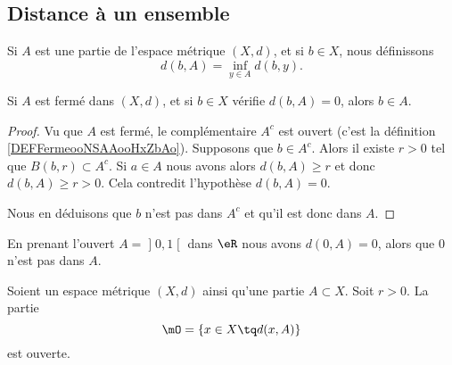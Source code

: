 \subsection{Distance à un ensemble}

\begin{definition}      \label{DEFooGNNUooFUZINs}
    Si \( A\) est une partie de l'espace métrique \( (X,d)\), et si \( b\in X\), nous définissons
    \begin{equation}
        d(b,A)=\inf_{y\in A}d(b,y).
    \end{equation}
\end{definition}

\begin{lemma}        \label{LEMooAIARooQADaxM}
    Si \( A\) est fermé dans \( (X,d)\), et si \( b\in X\) vérifie \( d(b,A)=0\), alors \( b\in A\).
\end{lemma}

\begin{proof}
    Vu que \( A\) est fermé, le complémentaire \( A^c\) est ouvert (c'est la définition \ref{DEFFermeooNSAAooHxZbAo}). Supposons que \( b\in A^c\). Alors il existe \( r>0\) tel que \( B(b,r)\subset A^c\). Si \( a\in A\) nous avons alors \( d(b,A)\geq r\) et donc \( d(b,A)\geq r>0\). Cela contredit l'hypothèse \( d(b,A)=0\).

    Nous en déduisons que \( b\) n'est pas dans \( A^c\) et qu'il est donc dans \( A\).
\end{proof}


\begin{example}
    En prenant l'ouvert \( A=\mathopen] 0 , 1 \mathclose[\) dans \( \eR\) nous avons \( d(0,A)=0\), alors que \( 0\) n'est pas dans \( A\).
\end{example}

\begin{lemma}    \label{LEMooJNRTooZyKiFC}
    Soient un espace métrique \( (X,d)\) ainsi qu'une partie \( A\subset X\). Soit \( r>0\). La partie
    \begin{equation}
        \mO=\{ x\in X\tq d(x,A) \}
    \end{equation}
    est ouverte.
\end{lemma}

